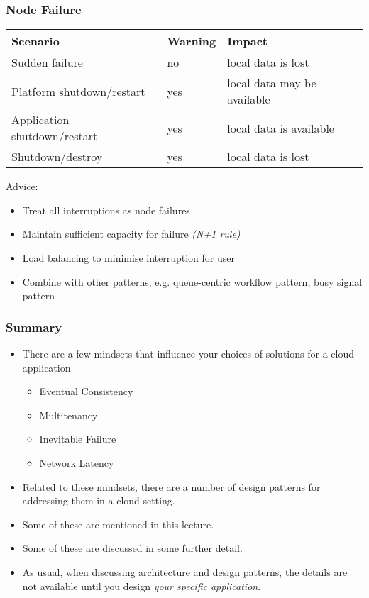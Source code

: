 \documentclass[10pt]{beamer}
\begin{document}
\begin{frame}[t]
\frametitle{Node Failure}
\begin{tabular}{lll}
Scenario & Warning & Impact\\
\hline
Sudden failure & no & local data is lost\\
Platform shutdown/restart & yes & local data may be available\\
Application shutdown/restart & yes & local data is available\\
Shutdown/destroy & yes & local data is lost\\
\hline
\end{tabular}

\vspace{0.5cm}
Advice:
\begin{itemize}
\item Treat all interruptions as node failures
\item Maintain sufficient capacity for failure \emph{(N+1 rule)}
\item Load balancing to minimise interruption for user
\item Combine with other patterns, e.g. queue-centric workflow pattern, busy signal pattern
\end{itemize}
\end{frame}

\begin{frame}[t]
\frametitle{Summary}
\begin{itemize}
\item There are a few mindsets that influence your choices of solutions for a cloud application
\begin{scriptsize}
\begin{itemize}
\item Eventual Consistency
\item Multitenancy
\item Inevitable Failure
\item Network Latency
\end{itemize}
\end{scriptsize}
\item Related to these mindsets, there are a number of design patterns for addressing them in a cloud setting.
\item Some of these are mentioned in this lecture.
\item Some of these are discussed in some further detail.
\item As usual, when discussing architecture and design patterns, the details are not available until you design \emph{your specific application}.
\end{itemize}
\end{frame}
\end{document}
